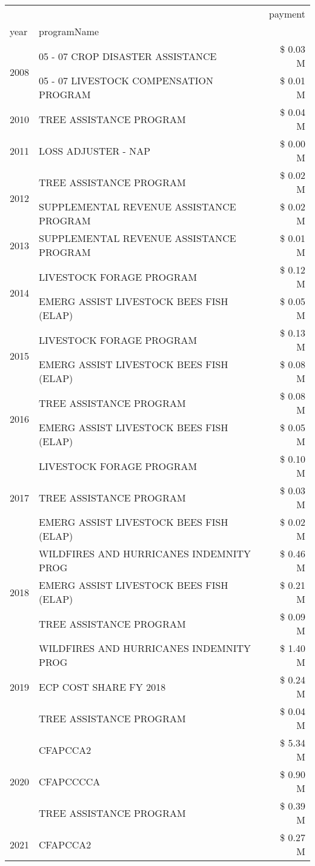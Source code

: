 \begin{tabular}{llr}
\toprule
 &  & payment \\
year & programName &  \\
\midrule
\multirow[t]{2}{*}{2008} & 05 - 07 CROP DISASTER ASSISTANCE & \$ 0.03 M \\
 & 05 - 07 LIVESTOCK COMPENSATION PROGRAM & \$ 0.01 M \\
\cline{1-3}
2010 & TREE ASSISTANCE PROGRAM & \$ 0.04 M \\
\cline{1-3}
2011 & LOSS ADJUSTER - NAP & \$ 0.00 M \\
\cline{1-3}
\multirow[t]{2}{*}{2012} & TREE ASSISTANCE PROGRAM & \$ 0.02 M \\
 & SUPPLEMENTAL REVENUE ASSISTANCE PROGRAM & \$ 0.02 M \\
\cline{1-3}
2013 & SUPPLEMENTAL REVENUE ASSISTANCE PROGRAM & \$ 0.01 M \\
\cline{1-3}
\multirow[t]{2}{*}{2014} & LIVESTOCK FORAGE PROGRAM & \$ 0.12 M \\
 & EMERG ASSIST LIVESTOCK BEES FISH (ELAP) & \$ 0.05 M \\
\cline{1-3}
\multirow[t]{2}{*}{2015} & LIVESTOCK FORAGE PROGRAM & \$ 0.13 M \\
 & EMERG ASSIST LIVESTOCK BEES FISH (ELAP) & \$ 0.08 M \\
\cline{1-3}
\multirow[t]{2}{*}{2016} & TREE ASSISTANCE PROGRAM                       & \$ 0.08 M \\
 & EMERG ASSIST LIVESTOCK BEES FISH (ELAP)       & \$ 0.05 M \\
\cline{1-3}
\multirow[t]{3}{*}{2017} & LIVESTOCK FORAGE PROGRAM & \$ 0.10 M \\
 & TREE ASSISTANCE PROGRAM & \$ 0.03 M \\
 & EMERG ASSIST LIVESTOCK BEES FISH (ELAP) & \$ 0.02 M \\
\cline{1-3}
\multirow[t]{3}{*}{2018} & WILDFIRES AND HURRICANES INDEMNITY PROG & \$ 0.46 M \\
 & EMERG ASSIST LIVESTOCK BEES FISH (ELAP) & \$ 0.21 M \\
 & TREE ASSISTANCE PROGRAM & \$ 0.09 M \\
\cline{1-3}
\multirow[t]{3}{*}{2019} & WILDFIRES AND HURRICANES INDEMNITY PROG & \$ 1.40 M \\
 & ECP COST SHARE FY 2018 & \$ 0.24 M \\
 & TREE ASSISTANCE PROGRAM & \$ 0.04 M \\
\cline{1-3}
\multirow[t]{3}{*}{2020} & CFAPCCA2 & \$ 5.34 M \\
 & CFAPCCCCA & \$ 0.90 M \\
 & TREE ASSISTANCE PROGRAM & \$ 0.39 M \\
\cline{1-3}
2021 & CFAPCCA2 & \$ 0.27 M \\
\cline{1-3}
\bottomrule
\end{tabular}
